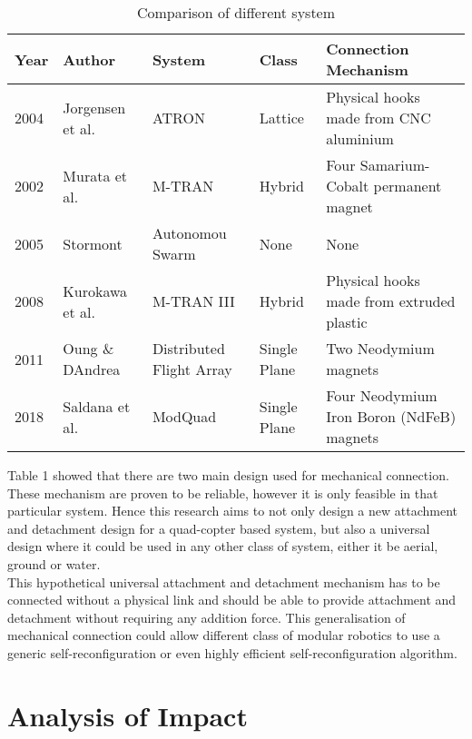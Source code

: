 \documentclass[12pt,A4]{article}
\begin{document}
	\begin{table}[h]
		\centering
		\caption{Comparison of different system}
		\begin{tabular}{lp{2cm}p{2.5cm}lp{5cm}}
			\hline
			\hline
			Year & Author           & System                   & Class        & Connection Mechanism                      \\ \hline
			2004 & Jorgensen et al. & ATRON                    & Lattice      & Physical hooks made from CNC aluminium    \\
			2002 & Murata et al.    & M-TRAN                   & Hybrid       & Four Samarium-Cobalt permanent magnet     \\
			2005 & Stormont         & Autonomou Swarm          & None         & None                                      \\
			2008 & Kurokawa et al.  & M-TRAN III               & Hybrid       & Physical hooks made from extruded plastic  \\
			2011 & Oung \& DAndrea  & Distributed Flight Array & Single Plane & Two Neodymium magnets                     \\
			2018 & Saldana et al.   & ModQuad                  & Single Plane & Four Neodymium Iron Boron (NdFeB) magnets	\\ \hline
		\end{tabular}
	\end{table}
	
	Table 1 showed that there are two main design used for mechanical connection. These mechanism are proven to be reliable, however it is only feasible in that particular system. Hence this research aims to not only design a new attachment and detachment design for a quad-copter based system, but also a universal design where it could be used in any other class of system, either it be aerial, ground or water. \\
	
	This hypothetical universal attachment and detachment mechanism has to be connected without a physical link and should be able to provide attachment and detachment without requiring any addition force. This generalisation of mechanical connection could allow different class of modular robotics to use a generic self-reconfiguration or even highly efficient self-reconfiguration algorithm.

	\section{Analysis of Impact}
	
\end{document}
